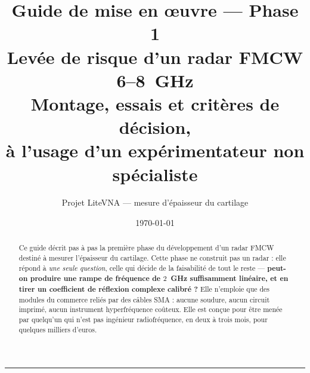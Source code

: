 \documentclass[11pt,a4paper]{article}
\title{\bfseries Guide de mise en \oe uvre --- Phase 1\\
       Levée de risque d'un radar FMCW 6--8~GHz\\[2mm]
       \large Montage, essais et critères de décision,\\
       à l'usage d'un expérimentateur non spécialiste}
\author{Projet LiteVNA --- mesure d'épaisseur du cartilage}
\date{\today}
\begin{document}
\maketitle

\begin{abstract}
\noindent
Ce guide décrit pas à pas la première phase du développement d'un radar FMCW
destiné à mesurer l'épaisseur du cartilage. Cette phase ne construit pas un
radar : elle répond à \emph{une seule question}, celle qui décide de la
faisabilité de tout le reste --- \textbf{peut-on produire une rampe de fréquence
de $2$~GHz suffisamment linéaire, et en tirer un coefficient de réflexion
complexe calibré ?} Elle n'emploie que des modules du commerce reliés par des
câbles SMA : aucune soudure, aucun circuit imprimé, aucun instrument
hyperfréquence coûteux. Elle est conçue pour être menée par quelqu'un qui n'est
pas ingénieur radiofréquence, en deux à trois mois, pour quelques milliers
d'euros.
\end{abstract}

\tableofcontents
\bigskip\hrule\bigskip


\end{document}

